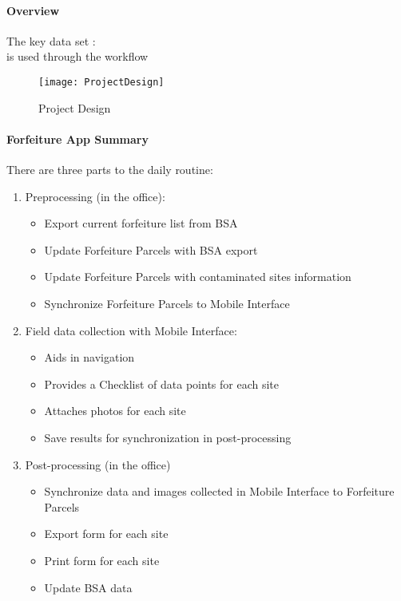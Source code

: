 \documentclass[class=book , crop=false, titlepage, twoside, multi={itemize, figure, verbatim}, float=false]{standalone}
\begin{document}
\paragraph[Overview]{Overview}
\vspace{.20in}

\noindent The key data set : {}\\
is used through the workflow
%
%
\begin{figure}[h!]
\centering
    \texttt{[image: ProjectDesign]}
\caption{Project Design}
\end{figure}
\clearpage
%
%
%
\paragraph{Forfeiture App Summary}
\vspace{.25in}

There are three parts to the daily routine:
\begin{enumerate}
\item \Large Preprocessing \normalsize(in the office):
%
\begin{itemize}
\item Export current forfeiture list from BSA
\item Update Forfeiture Parcels with BSA export
\item Update Forfeiture Parcels with contaminated sites information
\item Synchronize Forfeiture Parcels to Mobile Interface
\end{itemize}
%
\item \Large Field data collection \normalsize with Mobile Interface:
%
\begin{itemize}
\item Aids in navigation
\item Provides a Checklist of data points for each site
\item Attaches photos for each site
\item Save results for synchronization in post-processing
\end{itemize}
%
\item \Large Post-processing \normalsize (in the office)
%
\begin{itemize}
\item Synchronize data and images collected in Mobile Interface to Forfeiture Parcels
\item Export form for each site
\item Print form for each site
\item Update BSA data
%
\end{itemize}
%
\end{enumerate}
%
\clearpage
%
%
\end{document}
